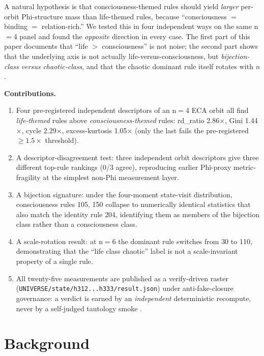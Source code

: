 \documentclass[11pt,a4paper]{article}
\begin{document}
A natural hypothesis is that consciousness-themed rules should yield
\emph{larger} per-orbit Phi-structure mass than life-themed rules, because
``consciousness $=$ binding $=$ relation-rich.'' We tested this in four
independent ways on the same n$=$4 panel and found the
\emph{opposite} direction in every case. The first part of this paper
documents that ``life $>$ consciousness'' is not noise; the second part
shows that the underlying axis is not actually
life-versus-consciousness, but \emph{bijection-class versus
chaotic-class}, and that the chaotic dominant rule itself rotates
with $n$.

\medskip
\noindent\textbf{Contributions.}
\begin{enumerate}\itemsep0.3em
\item Four pre-registered independent descriptors of an n$=$4 ECA orbit
      all find \emph{life-themed} rules above \emph{consciousness-themed}
      rules: rd\_ratio 2.86$\times$, Gini 1.44$\times$, cycle 2.29$\times$,
      excess-kurtosis 1.05$\times$ (only the last fails the
      pre-registered $\geq 1.5\times$ threshold).
\item A descriptor-disagreement test: three independent
      orbit descriptors give three different top-rule rankings
      (0/3 agree), reproducing earlier Phi-proxy metric-fragility
      \citep{anima_H268} at the simplest non-Phi measurement layer.
\item A bijection signature: under the four-moment state-visit
      distribution, consciousness rules \textsc{105}, \textsc{150}
      collapse to numerically identical statistics that also match the
      identity rule \textsc{204}, identifying them as members of the
      bijection class rather than a consciousness class.
\item A scale-rotation result: at n$=$6 the dominant rule switches
      from \textsc{30} to \textsc{110}, demonstrating that the
      ``life class chaotic'' label is not a scale-invariant property
      of a single rule.
\item All twenty-five measurements are published as a
      verify-driven raster
      (\texttt{UNIVERSE/state/h312...h333/result.json}) under
      anti-fake-closure governance: a verdict is earned by an
      \emph{independent} deterministic recompute, never by a
      self-judged tautology smoke \citep{anima_g73}.
\end{enumerate}

\section{Background}
\label{sec:bg}
\end{document}
